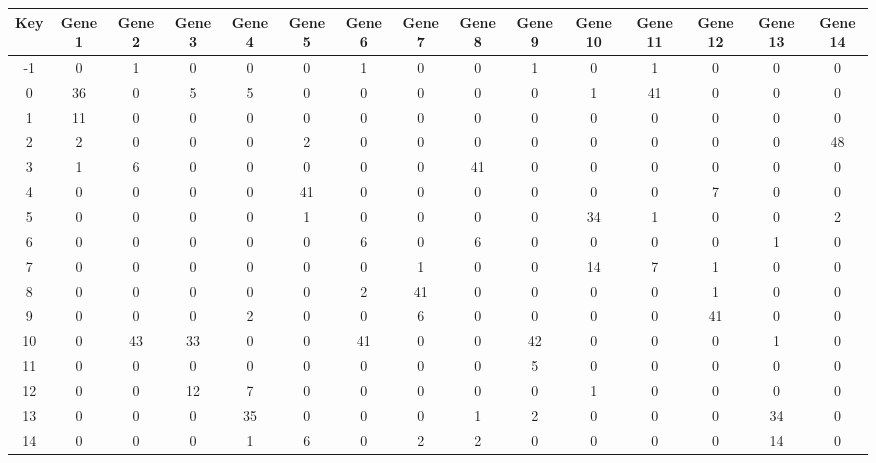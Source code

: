 \begin{tabular}{|c|c|c|c|c|c|c|c|c|c|c|c|c|c|c|}
\hline
Key & Gene 1 & Gene 2 & Gene 3 & Gene 4 & Gene 5 & Gene 6 & Gene 7 & Gene 8 & Gene 9 & Gene 10 & Gene 11 & Gene 12 & Gene 13 & Gene 14 \\
\hline
-1 & 0 & 1 & 0 & 0 & 0 & 1 & 0 & 0 & 1 & 0 & 1 & 0 & 0 & 0 \\
0 & 36 & 0 & 5 & 5 & 0 & 0 & 0 & 0 & 0 & 1 & 41 & 0 & 0 & 0 \\
1 & 11 & 0 & 0 & 0 & 0 & 0 & 0 & 0 & 0 & 0 & 0 & 0 & 0 & 0 \\
2 & 2 & 0 & 0 & 0 & 2 & 0 & 0 & 0 & 0 & 0 & 0 & 0 & 0 & 48 \\
3 & 1 & 6 & 0 & 0 & 0 & 0 & 0 & 41 & 0 & 0 & 0 & 0 & 0 & 0 \\
4 & 0 & 0 & 0 & 0 & 41 & 0 & 0 & 0 & 0 & 0 & 0 & 7 & 0 & 0 \\
5 & 0 & 0 & 0 & 0 & 1 & 0 & 0 & 0 & 0 & 34 & 1 & 0 & 0 & 2 \\
6 & 0 & 0 & 0 & 0 & 0 & 6 & 0 & 6 & 0 & 0 & 0 & 0 & 1 & 0 \\
7 & 0 & 0 & 0 & 0 & 0 & 0 & 1 & 0 & 0 & 14 & 7 & 1 & 0 & 0 \\
8 & 0 & 0 & 0 & 0 & 0 & 2 & 41 & 0 & 0 & 0 & 0 & 1 & 0 & 0 \\
9 & 0 & 0 & 0 & 2 & 0 & 0 & 6 & 0 & 0 & 0 & 0 & 41 & 0 & 0 \\
10 & 0 & 43 & 33 & 0 & 0 & 41 & 0 & 0 & 42 & 0 & 0 & 0 & 1 & 0 \\
11 & 0 & 0 & 0 & 0 & 0 & 0 & 0 & 0 & 5 & 0 & 0 & 0 & 0 & 0 \\
12 & 0 & 0 & 12 & 7 & 0 & 0 & 0 & 0 & 0 & 1 & 0 & 0 & 0 & 0 \\
13 & 0 & 0 & 0 & 35 & 0 & 0 & 0 & 1 & 2 & 0 & 0 & 0 & 34 & 0 \\
14 & 0 & 0 & 0 & 1 & 6 & 0 & 2 & 2 & 0 & 0 & 0 & 0 & 14 & 0 \\
\hline
\end{tabular}